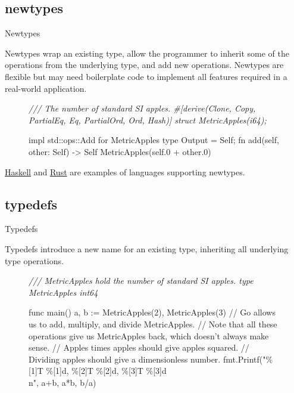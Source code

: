 \documentclass{article}
\begin{document}
\subsection{newtypes}{Newtypes}

Newtypes wrap an existing type, allow the programmer to inherit some of the operations from the underlying type, and add new operations.
Newtypes are flexible but may need boilerplate code to implement all features required in a real-world application.

\begin{figure}
\begin{code}
\em{/// The number of standard SI apples.}
#[derive(Clone, Copy, PartialEq, Eq, PartialOrd, Ord, Hash)]
struct MetricApples(i64);

impl std::ops::Add for MetricApples {
  type Output = Self;
  fn add(self, other: Self) -> Self {
    MetricApples(self.0 + other.0)
  }
}
\end{code}
\end{figure}

\href{https://wiki.haskell.org/Newtype}{Haskell} and \href{https://doc.rust-lang.org/book/ch19-04-advanced-types.html#using-the-newtype-pattern-for-type-safety-and-abstraction}{Rust} are examples of languages supporting newtypes.

\subsection{typedefs}{Typedefs}

Typedefs introduce a new name for an existing type, inheriting all underlying type operations.

\begin{figure}
\begin{code}
\em{/// MetricApples hold the number of standard SI apples.}
type MetricApples int64

func main() {
  a, b := MetricApples(2), MetricApples(3)
  // Go allows us to add, multiply, and divide MetricApples.
  // Note that all these operations give us MetricApples back, which doesn’t always make sense.
  // Apples times apples should give apples squared.
  // Dividing apples should give a dimensionless number.
  fmt.Printf("\%[1]T \%[1]d, \%[2]T \%[2]d, \%[3]T \%[3]d\\n", a+b, a*b, b/a)
}
\end{code}
\end{figure}
\end{document}
